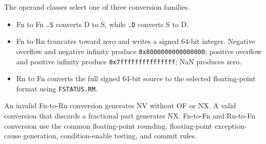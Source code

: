 The operand classes select one of three conversion families.

\begin{itemize}
\item Fn to Fn \texttt{.S} converts D to S, while \texttt{.D} converts S to D.
\item Fn to Rn truncates toward zero and writes a signed 64-bit integer. Negative overflow and negative infinity
produce \texttt{0x8000000000000000}; positive overflow and positive infinity produce
\texttt{0x7fffffffffffffff}; NaN produces zero.
\item Rn to Fn converts the full signed 64-bit source to the selected floating-point format using
\texttt{FSTATUS.RM}.
\end{itemize}
An invalid Fn-to-Rn conversion generates NV without OF or NX. A valid conversion that discards a fractional part
generates NX. Fn-to-Fn and Rn-to-Fn conversion use the common floating-point rounding, floating-point
exception-cause generation, condition-enable testing, and commit rules.
